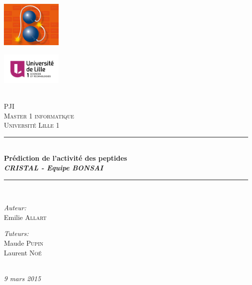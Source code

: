\documentclass[a4paper,10pt]{report}
\date{2014-2015}
\newcommand{\HRule}{\rule{\linewidth}{0.5mm}}
\begin{document}
\begin{titlepage}
 \begin{center}

 \begin{minipage}{0.4\textwidth}
    \begin{flushleft} \large
        \includegraphics[width=3cm]{bonsai.jpg}
    \end{flushleft}
  \end{minipage}
  \begin{minipage}{0.4\textwidth}
    \begin{flushright} \large
      \includegraphics[width=3cm]{lille1.png}
    \end{flushright}
  \end{minipage} 
  ~\\[3cm]

  \textsc{\LARGE PJI\\ Master 1 informatique}\\[1.5cm]

  \textsc{\Large Université Lille 1}\\[0.5cm]

  \HRule \\[0.5 cm]
  { \huge \bfseries Prédiction de l'activité des peptides\\[0.8cm] \large \emph{CRISTAL - Equipe BONSAI} \\[0.4cm] }
  \HRule \\[1.5 cm]

  \begin{minipage}{0.4\textwidth}
    \begin{flushleft} \large
      \emph{Auteur:}\\
	Emilie \textsc{Allart}
    \end{flushleft}
  \end{minipage}
  \begin{minipage}{0.4\textwidth}
    \begin{flushright} \large
      \emph{Tuteurs:} \\
      Maude \textsc{Pupin} \\
      Laurent \textsc{Noé}
    \end{flushright}
  \end{minipage} 

  \\[3cm]
  {\large \emph{9 mars 2015} }
  \vfill
 \end{center}
\end{titlepage}
\end{document}
